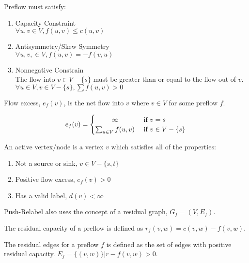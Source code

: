 Preflow must satisfy:
\begin{enumerate}
	\item Capacity Constraint\\
	$\forall u,v \in V, f(u,v) \leq c(u,v)$
	
	\item Antisymmetry/Skew Symmetry\\
	$\forall u, v, \in V, f(u,v) = -f(v,u)$
	
	\item Nonnegative Constrain\\
	The flow into $v \in V-\{s\}$ must be greater than or equal to the flow out of $v$. $\forall u \in V, v \in V-\{s\}, \sum f(u,v)>0$
\end{enumerate}

\begin{definition}
	Flow excess, $e_f(v)$, is the net flow into $v$ where $v \in V$ for some preflow $f$.
\end{definition}

\[
e_f(v) =
\begin{cases} 
\hfill \infty \hfill & \text{ if $v=s$} \\
\hfill \sum_{u \in V}f(u,v) \hfill & \text{ if $v \in V-\{s\}$} \\
\end{cases}
\]

\begin{definition}
	An active vertex/node is a vertex $v$ which satisfies all of the properties:
	\begin{enumerate}
		\item Not a source or sink, $v \in V-\{s,t\}$
		\item Positive flow excess, $e_f(v) > 0$
		\item Has a valid label, $d(v) < \infty$
	\end{enumerate}
\end{definition}

Push-Relabel also uses the concept of a residual graph, $G_f=(V, E_f)$.

\begin{definition}
	The residual capacity of a preflow is defined as $r_f(v,w) = c(v,w)-f(v,w)$.
\end{definition}

\begin{definition}
	The residual edges for a preflow $f$ is defined as the set of edges with positive residual capacity. $E_f = \{(v,w)\} | r-f(v,w) > 0$.
\end{definition}

